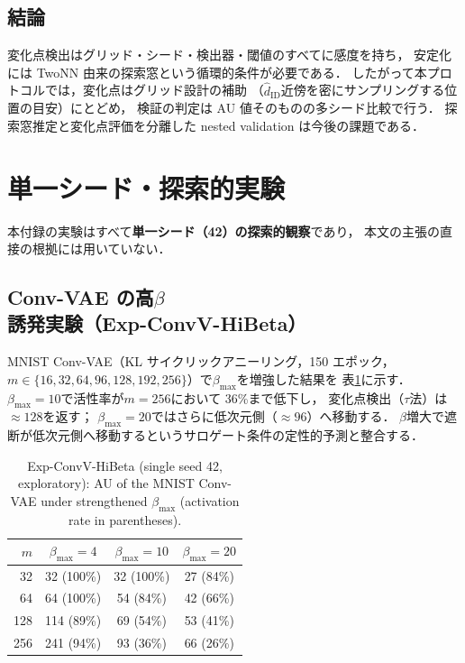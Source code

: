 \documentclass[11pt,a4paper]{jsarticle}
\newcommand{\hatdID}{\hat{d}_{\mathrm{ID}}}
\begin{document}
\subsection{結論}

変化点検出はグリッド・シード・検出器・閾値のすべてに感度を持ち，
安定化には TwoNN 由来の探索窓という循環的条件が必要である．
したがって本プロトコルでは，変化点はグリッド設計の補助
（$\hatdID$近傍を密にサンプリングする位置の目安）にとどめ，
検証の判定は AU 値そのものの多シード比較で行う．
探索窓推定と変化点評価を分離した nested validation は今後の課題である．

\section{単一シード・探索的実験}\label{app:exploratory}

本付録の実験はすべて\textbf{単一シード（42）の探索的観察}であり，
本文の主張の直接の根拠には用いていない．

\subsection{Conv-VAE の高$\beta$誘発実験（Exp-ConvV-HiBeta）}

MNIST Conv-VAE（KL サイクリックアニーリング，150 エポック，
$m \in \{16, 32, 64, 96, 128, 192, 256\}$）で$\beta_{\max}$を増強した結果を
表\ref{tab:hibeta}に示す．
$\beta_{\max} = 10$で活性率が$m = 256$において 36\%まで低下し，
変化点検出（$\tau$法）は$\approx 128$を返す；
$\beta_{\max} = 20$ではさらに低次元側（$\approx 96$）へ移動する．
$\beta$増大で遮断が低次元側へ移動するというサロゲート条件の定性的予測と整合する．

\begin{table}[H]
\centering
\caption{Exp-ConvV-HiBeta (single seed 42, exploratory): AU of the MNIST
Conv-VAE under strengthened $\beta_{\max}$ (activation rate in parentheses).}
\label{tab:hibeta}
\small
\begin{tabular}{rccc}
\toprule
$m$ & $\beta_{\max} = 4$ & $\beta_{\max} = 10$ & $\beta_{\max} = 20$ \\
\midrule
 32 & 32 (100\%) & 32 (100\%) & 27 (84\%) \\
 64 & 64 (100\%) & 54 (84\%) & 42 (66\%) \\
128 & 114 (89\%) & 69 (54\%) & 53 (41\%) \\
256 & 241 (94\%) & 93 (36\%) & 66 (26\%) \\
\bottomrule
\end{tabular}
\end{table}
\end{document}

